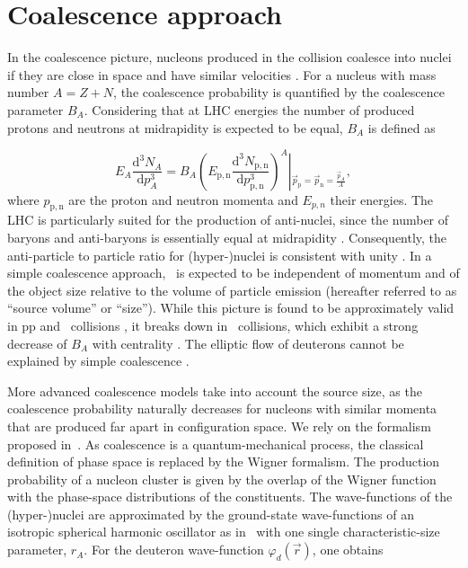 \section{Coalescence approach} \label{sec:coalescence}
In the coalescence picture, nucleons produced in the collision coalesce into nuclei if they are close in space and have similar velocities \cite{Butler:1963,Kapusta:1980}. 
For a nucleus with mass number $A = Z + N$, the coalescence probability is quantified by the coalescence parameter $B_{A}$.
Considering that at LHC energies the number of produced protons and neutrons at midrapidity is expected to be equal,  $B_{A}$ is defined as

\begin{equation}
E_{A}\frac{\mathrm{d}^{3}N_{A}}{\mathrm{d}p_{A}^{3}}=B_{A}{\left(E_{\mathrm{p,n}}\frac{\mathrm{d}^{3}N_{\mathrm{p,n}}}{\mathrm{d}p_{\mathrm{p,n}}^{3}}\right)^{A}}\left\vert_{\vec{p}_{\mathrm{p}}=\vec{p}_{\mathrm{n}}=\frac{\vec{p}_{A}}{A}} \right.,
\label{eq:BA}
\end{equation}
%
where $p_{\mathrm{p,n}}$ are the proton and neutron momenta and $E_{p,n}$ their energies.
%
The LHC is particularly suited for the production of anti-nuclei, since the number of baryons and anti-baryons is essentially equal at midrapidity \cite{Abbas:2013rua}. Consequently, the anti-particle to particle ratio for (hyper-)nuclei is consistent with unity \cite{ALICE:nucleipp2017, anielski-HQ14, Acharya:2017dmc, Adam:2015yta}.
In a simple coalescence approach, \bA~is expected to be independent of momentum and of the object size relative to the volume of particle emission (hereafter referred to as ``source volume'' or ``size'').
While this picture is found to be approximately valid in pp and \pPb~collisions \cite{ALICE:nucleipp2017, anielski-HQ14}, it breaks down in \PbPb~collisions, which exhibit a strong decrease of $B_{A}$ with centrality \cite{ALICE:deuteronppPbPb2015}. 
The elliptic flow of deuterons cannot be explained by simple coalescence \cite{Acharya:2017dmc}. 

More advanced coalescence models \cite{Sato:1981ez, Nagle:1996vp, Scheibl:1998tk} take into account the source size, as the coalescence probability naturally decreases for nucleons with similar momenta that are produced far apart in configuration space. We rely on the formalism proposed in~\cite{Scheibl:1998tk}.
As coalescence is a quantum-mechanical process, the classical definition of phase space is replaced by the Wigner formalism. The production probability of a nucleon cluster is given by the overlap of the Wigner function with the phase-space distributions of the constituents.
The wave-functions of the (hyper-)nuclei are approximated by the ground-state wave-functions of an isotropic spherical harmonic oscillator as in~\cite{Scheibl:1998tk} with one single characteristic-size parameter, $r_{A}$. 
For the deuteron wave-function $\varphi_{d}(\vec{r}) $, one obtains

